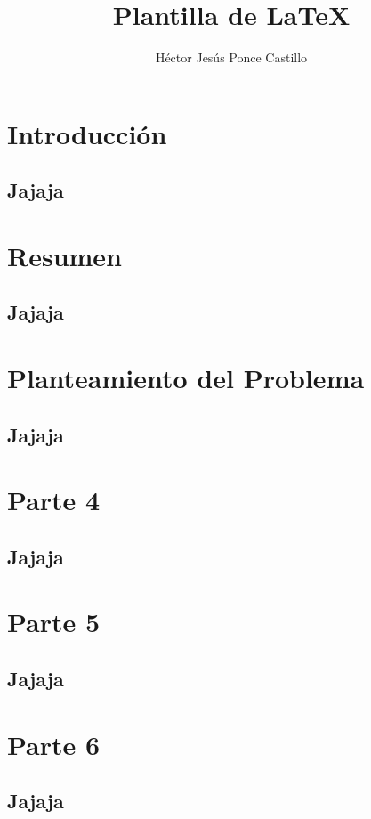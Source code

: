 \documentclass[11pt,letterpaper]{article}
\author{Héctor Jesús Ponce Castillo}
\title{Plantilla de LaTeX}
\begin{document}
\tableofcontents
\newpage
\section{Introducción}
	\subsection{Jajaja}
\newpage
\section{Resumen}
	\subsection{Jajaja}
\newpage
\section{Planteamiento del Problema}
	\subsection{Jajaja}
\newpage
\section{Parte 4}
	\subsection{Jajaja}
\newpage
\section{Parte 5}
	\subsection{Jajaja}
\newpage
\section{Parte 6}
	\subsection{Jajaja}
\end{document}
